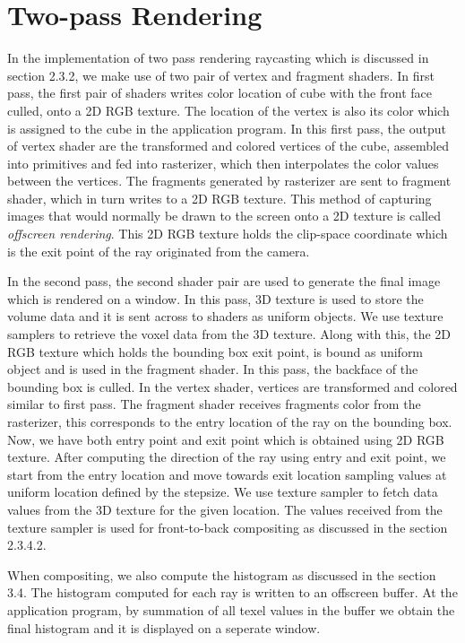 \section{Two-pass Rendering}

In the implementation of two pass rendering raycasting which is discussed in section 2.3.2, we make use of two pair of vertex and fragment shaders. In first pass, the first pair of shaders writes color location of cube with the front face culled, onto a 2D RGB texture. The location of the vertex is also its color which is assigned to the cube in the application program. In this first pass, the output of  vertex shader are the transformed and colored vertices of the cube,  assembled into primitives and fed into rasterizer, which then  interpolates the color values between the vertices. The fragments generated by rasterizer are sent to fragment shader, which in turn writes to a 2D RGB texture. This method of capturing images that would normally be drawn to the screen onto a 2D texture is called \textit{offscreen rendering}. This 2D RGB texture holds the clip-space coordinate which is the exit point of the ray originated from the camera.

In the second pass, the second shader pair are used to generate the final image which is rendered on a window. In this pass, 3D texture is used to store the volume data and it is sent across to shaders as uniform objects. We use texture samplers to retrieve the voxel data from the 3D texture.  Along with this, the 2D RGB texture which holds the bounding box exit point, is bound as uniform object and is used in the fragment shader. In this pass, the backface of the bounding box is culled. In the vertex shader, vertices are transformed and colored similar to first pass. The fragment shader receives fragments color from the rasterizer, this corresponds to the entry location of the ray on the bounding box. Now, we have both entry point and exit point which is obtained using 2D RGB texture. After computing the direction of the ray using entry and exit point, we start from the entry location and move towards exit location sampling values at uniform location defined by the stepsize. We use texture sampler to fetch data values from the 3D texture for the given location. The values received from the texture sampler is used for front-to-back compositing as discussed in the section 2.3.4.2.           

When compositing, we also compute the histogram as discussed in the section 3.4. The histogram computed for each ray is written to an offscreen buffer. At the application program, by summation of all texel values in the buffer we obtain the final histogram and it is displayed on a seperate window. 

